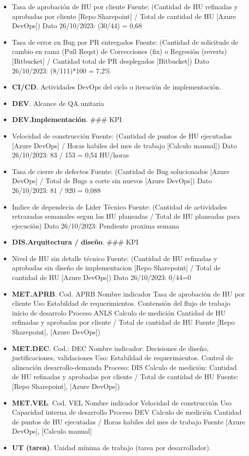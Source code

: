 \documentclass[
  paper=a4,
  ,captions=tableheading
]{scrartcl}
\begin{document}
\begin{itemize}
\item
  Tasa de aprobación de HU por cliente Fuente: (Cantidad de HU refinadas
  y aprobadas por cliente {[}Repo Sharepoint{]} / Total de cantidad de
  HU {[}Azure DevOps{]}) Dato 26/10/2023: (30/44) = 0,68
\item
  Tasa de error en Bug por PR entregados Fuente: (Cantidad de solicitude
  de cambio en rama (Pull Reqst) de Correcciones (fix) o Regresión
  (reverts) {[}Bitbucket{]} / Cantidad total de PR desplegados
  {[}Bitbucket{]}) Dato 26/10/2023: (8/111)*100 = 7,2\%
\item
  \textbf{CI/CD}. Actividades DevOps del ciclo o iteración de
  implementación.
\item
  \textbf{DEV}. Alcance de QA unitaria
\item
  \textbf{DEV.Implementación}. \#\#\# KPI
\item
  Velocidad de construcción Fuente: (Cantidad de puntos de HU ejecutadas
  {[}Azure DevOps{]} / Horas habiles del mes de trabajo {[}Calculo
  manual{]}) Dato 26/10/2023: 83 / 153 = 0,54 HU/horas
\item
  Tasa de cierre de defectos Fuente: (Cantidad de Bug solucionados
  {[}Azure DevOps{]} / Total de Bugs a corte sin nuevos {[}Azure
  DevOps{]}) Dato 26/10/2023: 81 / 920 = 0,088
\item
  Indice de dependecia de Lider Técnico Fuente: (Cantidad de actividades
  retrazadas semanales segun las HU planeadas / Total de HU planeadas
  para ejecución) Dato 26/10/2023: Pendiente proxima semana
\item
  \textbf{DIS.Arquitectura / diseño}. \#\#\# KPI
\item
  Nivel de HU sin detalle técnico Fuente: (Cantidad de HU refinadas y
  aprobadas sin diseño de implementacion {[}Repo Sharepoint{]} / Total
  de cantidad de HU {[}Azure DevOps{]}) Dato 26/10/2023: 0/44=0
\item
  \textbf{MET.APRB}. Cod. APRB Nombre indicador Tasa de aprobación de HU
  por cliente Uso Estabildad de requerimientos. Contensión del flujo de
  trabajo inicio de desarrolo Proceso ANLS Calculo de medición Cantidad
  de HU refinadas y aprobadas por cliente / Total de cantidad de HU
  Fuente {[}Repo Sharepoint{]}, {[}Azure DevOps{]})
\item
  \textbf{MET.DEC}. Cod.: DEC Nombre indicador: Decisiones de diseño,
  justificaciones, validaciones Uso: Estabildad de requerimientos.
  Control de alineación desarrollo-demanda Proceso: DIS Calculo de
  medición: Cantidad de HU refinadas y aprobadas por cliente / Total de
  cantidad de HU Fuente: {[}Repo Sharepoint{]}, {[}Azure DevOps{]})
\item
  \textbf{MET.VEL}. Cod. VEL Nombre indicador Velocidad de construcción
  Uso Capacidad interna de desarrollo Proceso DEV Calculo de medición
  Cantidad de puntos de HU ejecutadas / Horas habiles del mes de trabajo
  Fuente {[}Azure DevOps{]}, {[}Calculo manual{]}
\item
  \textbf{UT (tarea)}. Unidad mínima de trabajo (tarea por
  desarrollador).
\end{itemize}
\end{document}
